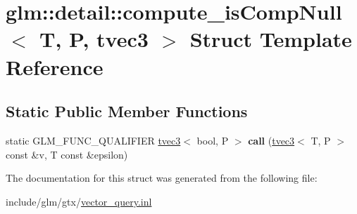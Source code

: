 \hypertarget{structglm_1_1detail_1_1compute__isCompNull_3_01T_00_01P_00_01tvec3_01_4}{}\section{glm\+:\+:detail\+:\+:compute\+\_\+is\+Comp\+Null$<$ T, P, tvec3 $>$ Struct Template Reference}
\label{structglm_1_1detail_1_1compute__isCompNull_3_01T_00_01P_00_01tvec3_01_4}
\subsection*{Static Public Member Functions}
\begin{DoxyCompactItemize}
\item 
\mbox{\label{structglm_1_1detail_1_1compute__isCompNull_3_01T_00_01P_00_01tvec3_01_4_aeed450148ffffe117e96c998a31a78e6}} 
static G\+L\+M\+\_\+\+F\+U\+N\+C\+\_\+\+Q\+U\+A\+L\+I\+F\+I\+ER \hyperlink{structglm_1_1tvec3}{tvec3}$<$ bool, P $>$ {\bfseries call} (\hyperlink{structglm_1_1tvec3}{tvec3}$<$ T, P $>$ const \&v, T const \&epsilon)
\end{DoxyCompactItemize}


The documentation for this struct was generated from the following file\+:\begin{DoxyCompactItemize}
\item 
include/glm/gtx/\hyperlink{vector__query_8inl}{vector\+\_\+query.\+inl}\end{DoxyCompactItemize}
